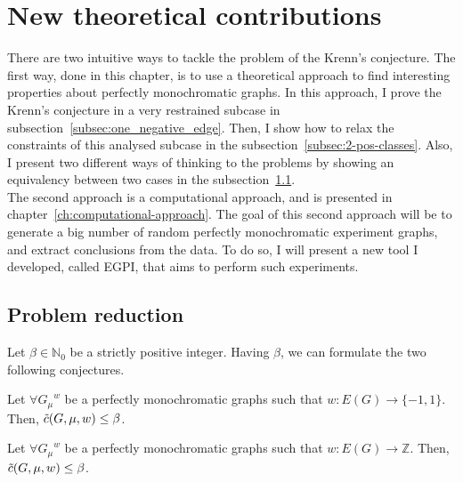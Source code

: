 \chapter{New theoretical contributions}
\label{ch:new-contributions}

There are two intuitive ways to tackle the problem of the Krenn's conjecture.
The first way, done in this chapter, is to use a theoretical approach to find interesting properties about perfectly monochromatic graphs.
In this approach, I prove the Krenn's conjecture in a very restrained subcase in subsection~\ref{subsec:one_negative_edge}.
Then, I show how to relax the constraints of this analysed subcase in the subsection~\ref{subsec:2-pos-classes}.
Also, I present two different ways of thinking to the problems by showing an equivalency between two cases in the subsection~\ref{sec:problem-reduction}.\\

The second approach is a computational approach, and is presented in chapter~\ref{ch:computational-approach}.
The goal of this second approach will be to generate a big number of random perfectly monochromatic experiment graphs, and extract conclusions from the data.
To do so, I will present a new tool I developed, called EGPI, that aims to perform such experiments.


\section{Problem reduction}
\label{sec:problem-reduction}

Let $\beta \in \mathbb{N}_0$ be a strictly positive integer.
Having $\beta$, we can formulate the two following conjectures.

\begin{conjecture}
    \label{con:c-bounded-by-beta-binary}
    Let $\forall {G_\mu}^w$ be a perfectly monochromatic graphs such that $w: E(G) \rightarrow \{-1, 1\}$.
    Then, $\Tilde{c}(G, \mu, w) \leq \beta$.
\end{conjecture}

\begin{conjecture}
    \label{con:c-bounded-by-beta-integer}
    Let $\forall {G_\mu}^w$ be a perfectly monochromatic graphs such that $w: E(G) \rightarrow \mathbb{Z}$.
    Then, $\Tilde{c}(G, \mu, w) \leq \beta$.
\end{conjecture}

